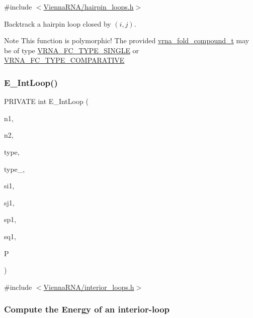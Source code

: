 {\ttfamily \#include $<$\hyperlink{hairpin__loops_8h}{Vienna\+R\+N\+A/hairpin\+\_\+loops.\+h}$>$}



Backtrack a hairpin loop closed by $ (i,j) $. 

\begin{DoxyNote}{Note}
This function is polymorphic! The provided \hyperlink{group__fold__compound_ga1b0cef17fd40466cef5968eaeeff6166}{vrna\+\_\+fold\+\_\+compound\+\_\+t} may be of type \hyperlink{group__fold__compound_gga01a4ff86fa71deaaa5d1abbd95a1447da7e264dd3cf2dc9b6448caabcb7763cd6}{V\+R\+N\+A\+\_\+\+F\+C\+\_\+\+T\+Y\+P\+E\+\_\+\+S\+I\+N\+G\+LE} or \hyperlink{group__fold__compound_gga01a4ff86fa71deaaa5d1abbd95a1447dab821ce46ea3cf665be97df22a76f5023}{V\+R\+N\+A\+\_\+\+F\+C\+\_\+\+T\+Y\+P\+E\+\_\+\+C\+O\+M\+P\+A\+R\+A\+T\+I\+VE} 
\end{DoxyNote}
\mbox{\label{group__loops_gaafbc187b7f78e8e82afb77dd6f3b8fc5}} 
\subsubsection{\texorpdfstring{E\+\_\+\+Int\+Loop()}{E\_IntLoop()}}
{\footnotesize\ttfamily P\+R\+I\+V\+A\+TE int E\+\_\+\+Int\+Loop (\begin{DoxyParamCaption}\item[{int}]{n1,  }\item[{int}]{n2,  }\item[{int}]{type,  }\item[{int}]{type\+\_,  }\item[{int}]{si1,  }\item[{int}]{sj1,  }\item[{int}]{sp1,  }\item[{int}]{sq1,  }\item[{\hyperlink{group__energy__parameters_ga8a69ca7d787e4fd6079914f5343a1f35}{vrna\+\_\+param\+\_\+t} $\ast$}]{P }\end{DoxyParamCaption})}



{\ttfamily \#include $<$\hyperlink{interior__loops_8h}{Vienna\+R\+N\+A/interior\+\_\+loops.\+h}$>$}

\subsubsection*{Compute the Energy of an interior-\/loop}

